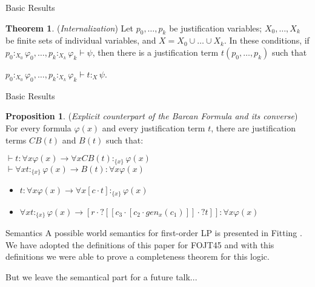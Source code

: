 \documentclass{beamer}
\theoremstyle{definition}
\newtheorem{teor}{Theorem}
\newtheorem{pro}{Proposition}
\newcommand{\impli}{\rightarrow}
\newcommand{\todo}{\forall}
\newcommand{\teo}{\vdash}
\begin{document}
\begin{frame}{Basic Results}


\begin{teor}
	(\textit{Internalization}) Let $p_{0}, \dots, p_{k}$ be justification variables; $X_{0}, \dots, X_{k}$ be finite sets of individual variables, and $X =X_{0} \cup \dots \cup X_{k}$. In these conditions, if  $p_{0}$$:_{X_{0}}$$\varphi_{0}, \dots, p_{k}$$:_{X_{k}}$$\varphi_{k} \teo \psi$, then there is a justification term $t(p_{0}, \dots, p_{k})$ such that 

	\begin{center}
	$p_{0}$$:_{X_{0}}$$\varphi_{0}, \dots, 
	p_{k}$$:_{X_{k}}$$\varphi_{k} \teo t$$:_{X}$$\psi$.
	\end{center}

\end{teor}
\end{frame}




	
	
	
\begin{frame}{Basic Results}
	
\begin{pro}
	(\textit{Explicit counterpart of the Barcan Formula and its converse}) For every formula $\varphi(x)$ and every justification term $t$, there are justification terms $CB(t)$ and $B(t)$ such that: 
	\begin{center}
		$\teo t$$:$$\todo x \varphi(x) \impli \todo x CB(t)$$:_{\{x\}}$$\varphi(x)$\\
		\vspace{2 mm}
		$\teo \todo x t$$:_{\{x\}}$$\varphi(x) \impli B(t)$$:$$\todo x \varphi(x)$
	\end{center}
\end{pro}	
\vspace{2 mm}
\begin{itemize}
\item<2-> $t:\todo x \varphi (x) \impli \todo x [c \cdot t]$$:_{\{x\}} \varphi(x)$
\vspace{2 mm}
\item<3-> $\todo x t$$:_{\{x\}}$$\varphi(x) \impli[r \cdot ?[[c_{3} \cdot [c_{2} \cdot gen_{x}(c_{1})]]\cdot ?t]]$$:\todo x \varphi(x)$   		
\end{itemize}


\end{frame}	
	

	

\begin{frame}{Semantics}
\qquad A possible world semantics for first-order LP is presented in Fitting \cite{Fitting14}. We have adopted the definitions of this paper for FOJT45 and with this definitions we were able to prove a completeness theorem for this logic. 

\vspace{5mm}

\qquad But we leave the semantical part for a future talk...

\end{frame}
\end{document}
